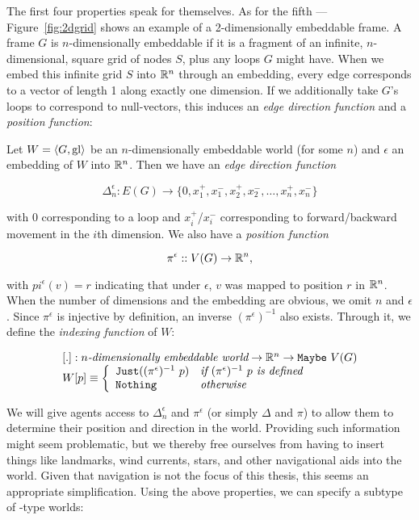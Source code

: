 The first four properties speak for themselves. As for the fifth --- Figure~\ref{fig:2dgrid} shows an example of a 2-dimensionally embeddable frame. A frame $G$ is $n$-dimensionally embeddable if it is a fragment of an infinite, $n$-dimensional, square grid of nodes $S$, plus any loops $G$ might have. When we embed this infinite grid $S$ into $\mathbb{R}^n$ through an embedding, every edge corresponds to a vector of length 1 along exactly one dimension. If we additionally take $G$'s loops to correspond to null-vectors, this induces an {\em edge direction function} and a {\em position function}:

\begin{definition}
Let $W = \langle G, \mathrm{gl} \rangle$ be an $n$-dimensionally embeddable world (for some $n$) and $\epsilon$ an embedding of $W$ into $\mathbb{R}^n$. Then we have an {\em edge direction function} 

$$\Delta_n^\epsilon : E(G) \rightarrow \{0,x_1^+,x_1^-,x_2^+,x_2^-,\dots,x_n^+,x_n^-\}$$

with $0$ corresponding to a loop and $x_i^+$/$x_i^-$ corresponding to forward/backward movement in the $i$th dimension. We also have a {\em position function}

$$\pi^\epsilon :: V(G) \rightarrow \mathbb{R}^n,$$

with $pi^\epsilon(v) = r$ indicating that under $\epsilon$, $v$ was mapped to position $r$ in $\mathbb{R}^n$. When the number of dimensions and the embedding are obvious, we omit $n$ and $\epsilon$.
Since $\pi^\epsilon$ is injective by definition, an inverse $(\pi^\epsilon)^{-1}$ also exists. Through it, we define the {\em indexing function} of $W$:

$$
	\begin{array}{l}
		[.] : n\textit{-dimensionally embeddable world} \rightarrow \mathbb{R}^n \rightarrow \mathtt{Maybe}\ V(G)\\
		W[p] \equiv \left\{
			\begin{array}{l l}
				\mathtt{Just } ((\pi^\epsilon)^{-1}\ p) & \textit{if } (\pi^\epsilon)^{-1}\ p \textit{ is defined}\\
				\mathtt{Nothing} & \textit{otherwise}
			\end{array}
			\right.
	\end{array}
$$
\end{definition}

We will give agents access to $\Delta_n^\epsilon$ and $\pi^\epsilon$ (or simply $\Delta$ and $\pi$) to allow them to determine their position and direction in the world. Providing such information might seem problematic, but we thereby free ourselves from having to insert things like landmarks, wind currents, stars, and other navigational aids into the world. Given that navigation is not the focus of this thesis, this seems an appropriate simplification. Using the above properties, we can specify a subtype of \wext-type worlds:

